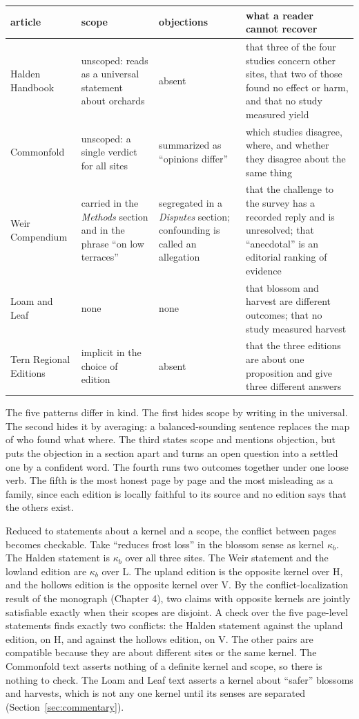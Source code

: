 \documentclass[11pt]{article}
\begin{document}
\begin{center}
\small
\begin{tabularx}{\textwidth}{@{}>{\raggedright\arraybackslash}p{} X X X@{}}
\toprule
article & scope & objections & what a reader cannot recover\\
\midrule
Halden Handbook & unscoped: reads as a universal statement about orchards & absent & that three of the four studies concern other sites, that two of those found no effect or harm, and that no study measured yield\\
Commonfold & unscoped: a single verdict for all sites & summarized as ``opinions differ'' & which studies disagree, where, and whether they disagree about the same thing\\
Weir Compendium & carried in the \emph{Methods} section and in the phrase ``on low terraces'' & segregated in a \emph{Disputes} section; confounding is called an allegation & that the challenge to the survey has a recorded reply and is unresolved; that ``anecdotal'' is an editorial ranking of evidence\\
Loam and Leaf & none & none & that blossom and harvest are different outcomes; that no study measured harvest\\
Tern Regional Editions & implicit in the choice of edition & absent & that the three editions are about one proposition and give three different answers\\
\bottomrule
\end{tabularx}
\end{center}

The five patterns differ in kind. The first hides scope by writing in the universal. The second hides it by averaging: a balanced-sounding sentence replaces the map of who found what where. The third states scope and mentions objection, but puts the objection in a section apart and turns an open question into a settled one by a confident word. The fourth runs two outcomes together under one loose verb. The fifth is the most honest page by page and the most misleading as a family, since each edition is locally faithful to its source and no edition says that the others exist.

Reduced to statements about a kernel and a scope, the conflict between pages becomes checkable. Take ``reduces frost loss'' in the blossom sense as kernel $\kappa_b$. The Halden statement is $\kappa_b$ over all three sites. The Weir statement and the lowland edition are $\kappa_b$ over L. The upland edition is the opposite kernel over H, and the hollows edition is the opposite kernel over V. By the conflict-localization result of the monograph (Chapter 4), two claims with opposite kernels are jointly satisfiable exactly when their scopes are disjoint. A check over the five page-level statements finds exactly two conflicts: the Halden statement against the upland edition, on H, and against the hollows edition, on V. The other pairs are compatible because they are about different sites or the same kernel. The Commonfold text asserts nothing of a definite kernel and scope, so there is nothing to check. The Loam and Leaf text asserts a kernel about ``safer'' blossoms and harvests, which is not any one kernel until its senses are separated (Section~\ref{sec:commentary}).
\end{document}
